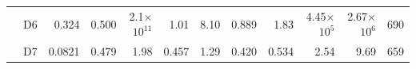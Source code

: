 \begin{tabular}{llrrrrrrrrrr}
 & D6 & \cellcolor[HTML]{d53d69}\textcolor[HTML]{f1f1f1}{0.324}& \cellcolor[HTML]{d53d69}\textcolor[HTML]{f1f1f1}{0.500}& \cellcolor[HTML]{d53d69}\textcolor[HTML]{f1f1f1}{2.1×$10^{11}$}& \cellcolor[HTML]{de7594}\textcolor[HTML]{f1f1f1}{1.01}& \cellcolor[HTML]{d53d69}\textcolor[HTML]{f1f1f1}{8.10}& \cellcolor[HTML]{db6487}\textcolor[HTML]{f1f1f1}{0.889}& \cellcolor[HTML]{e189a3}\textcolor[HTML]{f1f1f1}{1.83}& \cellcolor[HTML]{d53d69}\textcolor[HTML]{f1f1f1}{4.45×$10^{5}$}& \cellcolor[HTML]{d53d69}\textcolor[HTML]{f1f1f1}{2.67×$10^{6}$}& \cellcolor[HTML]{e6a3b6}\textcolor[HTML]{000000}{690}\\
 & D7 & \cellcolor[HTML]{398641}\textcolor[HTML]{f1f1f1}{0.0821}& \cellcolor[HTML]{d53d69}\textcolor[HTML]{f1f1f1}{0.479}& \cellcolor[HTML]{7fb184}\textcolor[HTML]{f1f1f1}{1.98}& \cellcolor[HTML]{7bae80}\textcolor[HTML]{f1f1f1}{0.457}& \cellcolor[HTML]{d53d69}\textcolor[HTML]{f1f1f1}{1.29}& \cellcolor[HTML]{d0e2d2}\textcolor[HTML]{000000}{0.420}& \cellcolor[HTML]{398641}\textcolor[HTML]{f1f1f1}{0.534}& \cellcolor[HTML]{cfe1d1}\textcolor[HTML]{000000}{2.54}& \cellcolor[HTML]{c4dac6}\textcolor[HTML]{000000}{9.69}& \cellcolor[HTML]{e7aebf}\textcolor[HTML]{000000}{659}\\
\end{tabular}
